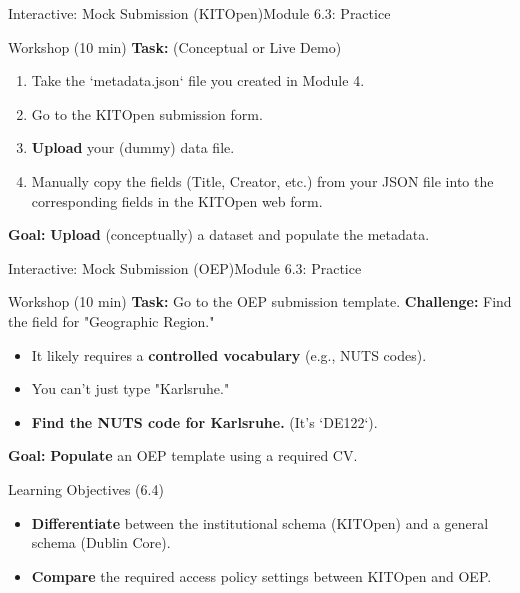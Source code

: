 \begin{frame}{Interactive: Mock Submission (KITOpen)}{Module 6.3: Practice}
    \begin{block}{Workshop (10 min)}
        \textbf{Task:} (Conceptual or Live Demo)
        \pause
        \begin{enumerate}
            \item Take the `metadata.json` file you created in Module 4.
            \pause
            \item Go to the KITOpen submission form.
            \pause
            \item \textbf{Upload} your (dummy) data file.
            \pause
            \item Manually copy the fields (Title, Creator, etc.) from your JSON file into the corresponding fields in the KITOpen web form.
        \end{enumerate}
        \pause
        \textbf{Goal:} \textbf{Upload} (conceptually) a dataset and populate the metadata.
    \end{block}
\end{frame}

\begin{frame}{Interactive: Mock Submission (OEP)}{Module 6.3: Practice}
    \begin{block}{Workshop (10 min)}
        \textbf{Task:} Go to the OEP submission template.
        \pause
        \textbf{Challenge:} Find the field for "Geographic Region."
        \pause
        \begin{itemize}
            \item It likely requires a \textbf{controlled vocabulary} (e.g., NUTS codes).
            \item You can't just type "Karlsruhe."
            \item \textbf{Find the NUTS code for Karlsruhe.} (It's `DE122`).
        \end{itemize}
        \pause
        \textbf{Goal:} \textbf{Populate} an OEP template using a required CV.
    \end{block}
\end{frame}

\begin{frame}{Learning Objectives (6.4)}
    \begin{itemize}
        \item \textbf{Differentiate} between the institutional schema (KITOpen) and a general schema (Dublin Core).
        \item \textbf{Compare} the required access policy settings between KITOpen and OEP.
    \end{itemize}
\end{frame}

